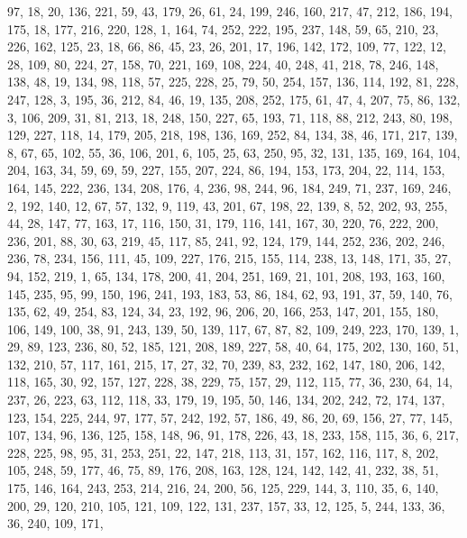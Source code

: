 \begin{DoxyCode}
       97, 18, 20, 136, 221, 59, 43, 179, 26, 61, 24, 199, 246, 160, 217, 47, 212, 186, 194, 175, 18, 177, 216, 220,
       128, 1, 164, 74, 252, 222, 195, 237, 148, 59, 65, 210, 23, 226, 162, 125, 23, 18, 66, 86, 45, 23, 26, 201,
       17, 196, 142, 172, 109, 77, 122, 12, 28, 109, 80, 224, 27, 158, 70, 221, 169, 108, 224, 40, 248, 41, 218, 78,
       246, 148, 138, 48, 19, 134, 98, 118, 57, 225, 228, 25, 79, 50, 254, 157, 136, 114, 192, 81, 228, 247, 128,
       3, 195, 36, 212, 84, 46, 19, 135, 208, 252, 175, 61, 47, 4, 207, 75, 86, 132, 3, 106, 209, 31, 81, 213, 18,
       248, 150, 227, 65, 193, 71, 118, 88, 212, 243, 80, 198, 129, 227, 118, 14, 179, 205, 218, 198, 136, 169,
       252, 84, 134, 38, 46, 171, 217, 139, 8, 67, 65, 102, 55, 36, 106, 201, 6, 105, 25, 63, 250, 95, 32, 131, 135,
       169, 164, 104, 204, 163, 34, 59, 69, 59, 227, 155, 207, 224, 86, 194, 153, 173, 204, 22, 114, 153, 164, 145,
       222, 236, 134, 208, 176, 4, 236, 98, 244, 96, 184, 249, 71, 237, 169, 246, 2, 192, 140, 12, 67, 57, 132, 9,
       119, 43, 201, 67, 198, 22, 139, 8, 52, 202, 93, 255, 44, 28, 147, 77, 163, 17, 116, 150, 31, 179, 116, 141,
       167, 30, 220, 76, 222, 200, 236, 201, 88, 30, 63, 219, 45, 117, 85, 241, 92, 124, 179, 144, 252, 236, 202,
       246, 236, 78, 234, 156, 111, 45, 109, 227, 176, 215, 155, 114, 238, 13, 148, 171, 35, 27, 94, 152, 219, 1,
       65, 134, 178, 200, 41, 204, 251, 169, 21, 101, 208, 193, 163, 160, 145, 235, 95, 99, 150, 196, 241, 193, 183,
       53, 86, 184, 62, 93, 191, 37, 59, 140, 76, 135, 62, 49, 254, 83, 124, 34, 23, 192, 96, 206, 20, 166, 253,
       147, 201, 155, 180, 106, 149, 100, 38, 91, 243, 139, 50, 139, 117, 67, 87, 82, 109, 249, 223, 170, 139, 1, 29,
       89, 123, 236, 80, 52, 185, 121, 208, 189, 227, 58, 40, 64, 175, 202, 130, 160, 51, 132, 210, 57, 117, 161,
       215, 17, 27, 32, 70, 239, 83, 232, 162, 147, 180, 206, 142, 118, 165, 30, 92, 157, 127, 228, 38, 229, 75,
       157, 29, 112, 115, 77, 36, 230, 64, 14, 237, 26, 223, 63, 112, 118, 33, 179, 19, 195, 50, 146, 134, 202, 242,
       72, 174, 137, 123, 154, 225, 244, 97, 177, 57, 242, 192, 57, 186, 49, 86, 20, 69, 156, 27, 77, 145, 107,
       134, 96, 136, 125, 158, 148, 96, 91, 178, 226, 43, 18, 233, 158, 115, 36, 6, 217, 228, 225, 98, 95, 31, 253,
       251, 22, 147, 218, 113, 31, 157, 162, 116, 117, 8, 202, 105, 248, 59, 177, 46, 75, 89, 176, 208, 163, 128,
       124, 142, 142, 41, 232, 38, 51, 175, 146, 164, 243, 253, 214, 216, 24, 200, 56, 125, 229, 144, 3, 110, 35, 6,
       140, 200, 29, 120, 210, 105, 121, 109, 122, 131, 237, 157, 33, 12, 125, 5, 244, 133, 36, 36, 240, 109, 171,

\end{DoxyCode}
